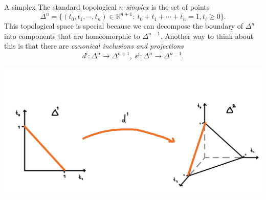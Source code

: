 \documentclass{beamer}
\newcommand{\R}[1]{\mathbb{R}^{#1}}
\begin{document}
\begin{frame}{A simplex}
The standard topological \emph{$n$-simplex} is the set of points
\[
\Delta^n = \{(t_0,t_1,\cdots,t_n)\in\R{n+1}: \: t_0+t_1+\cdots+t_n = 1, t_i \geq 0 \}.
\]
This topological space is special because we can decompose the boundary of $\Delta^n$ into components that are homeomorphic to $\Delta^{n-1}$. Another way to think about this is that there are \emph{canonical inclusions and projections}
\[
d^i:\Delta^n \to \Delta^{n+1}, \: s^i:\Delta^n \to \Delta^{n-1}.
\]
\begin{center}
\includegraphics[scale=0.06]{simpliciesupmap}
\end{center}
\end{frame}
\end{document}
